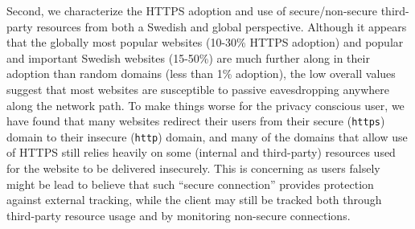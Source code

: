 \documentclass[letterpaper]{sig-alternate-10pt}
\begin{document}
Second, we characterize the HTTPS adoption and use of secure/non-secure third-party resources from 
both a Swedish and global perspective.  
Although it appears that the globally most popular websites (10-30\% HTTPS adoption)
and popular and important Swedish websites (15-50\%) are much further along in their adoption
than random domains (less than 1\% adoption), the low overall values suggest 
that most websites are susceptible to passive eavesdropping anywhere along the network path.  
To make things worse for the privacy conscious user, we have found that many websites redirect 
their users from their secure (\texttt{https}) domain to their insecure (\texttt{http}) domain, 
and many of the domains that allow use of HTTPS still 
relies heavily on some (internal and third-party)
resources used for the website to be delivered insecurely.
This is concerning as users falsely might be lead to 
believe that such “secure connection” 
provides protection against external tracking,
while the client may still be tracked both through third-party resource usage
and by monitoring non-secure connections. 
\end{document}
